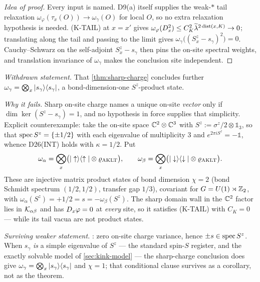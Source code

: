 \begin{proof}[Idea of proof]
Every input is named. D9(a) itself supplies the weak-$*$ tail relaxation
$\omega_\varphi(\tau_x(O))\to\omega_\gamma(O)$ for local $O$, so no extra
relaxation hypothesis is needed. (K-TAIL) at $x=x'$ gives
$\omega_\varphi(D_x^2)\le C_K^2\widetilde{\lambda}^{2\operatorname{dist}(x,K)}\to0$; translating along
the tail and passing to the limit gives
$\omega_\gamma\bigl((S^z_x-s_\gamma)^2\bigr)=0$. Cauchy--Schwarz on the
self-adjoint $S^z_x-s_\gamma$ then pins the on-site spectral weights, and
translation invariance of $\omega_\gamma$ makes the conclusion site
independent.
\end{proof}

\begin{refutedclaim}
\label{ref:chi-one}
\statusRefuted\;
\emph{Withdrawn statement.} That \cref{thm:sharp-charge} concludes further
$\omega_\gamma=\bigotimes_x|s_\gamma\rangle\langle s_\gamma|$, a bond-dimension-one
$S^z$-product state.

\emph{Why it fails.} Sharp on-site charge names a unique on-site \emph{vector}
only if $\dim\ker(S^z-s_\gamma)=1$, and no hypothesis in force supplies that
simplicity. Explicit counterexample: take the on-site space $\mathbb{C}^2\otimes\mathbb{C}^3$
with $S^z:=\sigma^z/2\otimes\mathbb{1}_3$, so that
$\operatorname{spec} S^z=\{\pm1/2\}$ with each eigenvalue of multiplicity $3$ and
$e^{2\pi iS^z}=-\mathbb{1}$, whence D26(INT) holds with $\kappa=1/2$. Put
\begin{equation}
  \omega_\alpha=\bigotimes_x\bigl(|\uparrow\rangle\langle \uparrow|\otimes
  \varrho_{\mathrm{AKLT}}\bigr),\qquad
  \omega_\beta=\bigotimes_x\bigl(|\downarrow\rangle\langle \downarrow|\otimes
  \varrho_{\mathrm{AKLT}}\bigr).
  \label{eq:chi-two-counterexample}
\end{equation}
These are injective matrix product states of bond dimension $\chi=2$ (bond
Schmidt spectrum $(1/2,1/2)$, transfer gap $1/3$), covariant for
$G=U(1)\rtimes\mathbb{Z}_2$, with $\omega_\alpha(S^z)=+1/2=s=-\omega_\beta(S^z)$. The
sharp domain wall in the $\mathbb{C}^2$ factor lies in $\mathcal{K}_{\alpha\beta}$ and has
$D_x\varphi=0$ at \emph{every} site, so it satisfies (K-TAIL) with
$C_K=0$ --- while its tail vacua are not product states.

\emph{Surviving weaker statement.} : zero on-site charge
variance, hence $\pm s\in\operatorname{spec} S^z$. When $s_\gamma$ \emph{is} a simple
eigenvalue of $S^z$ --- the standard spin-$S$ register, and the exactly
solvable model of \cref{sec:kink-model} --- the sharp-charge conclusion does
give $\omega_\gamma=\bigotimes_x|s_\gamma\rangle\langle s_\gamma|$ and $\chi=1$;
that conditional clause survives as a corollary, not as the theorem.
\end{refutedclaim}

